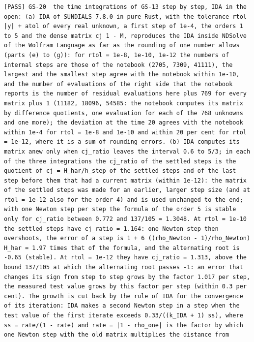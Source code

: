 \documentclass[
  10pt,
]{article}
\begin{document}
\begin{verbatim}
[PASS] GS-20  the time integrations of GS-13 step by step, IDA in the open: (a) IDA of SUNDIALS 7.8.0 in pure Rust, with the tolerance rtol |y| + atol of every real unknown, a first step of 1e-4, the orders 1 to 5 and the dense matrix cj 1 - M, reproduces the IDA inside NDSolve of the Wolfram Language as far as the rounding of one number allows (parts (e) to (g)): for rtol = 1e-8, 1e-10, 1e-12 the numbers of internal steps are those of the notebook (2705, 7309, 41111), the largest and the smallest step agree with the notebook within 1e-10, and the number of evaluations of the right side that the notebook reports is the number of residual evaluations here plus 769 for every matrix plus 1 (11182, 18096, 54585: the notebook computes its matrix by difference quotients, one evaluation for each of the 768 unknowns and one more); the deviation at the time 20 agrees with the notebook within 1e-4 for rtol = 1e-8 and 1e-10 and within 20 per cent for rtol = 1e-12, where it is a sum of rounding errors. (b) IDA computes its matrix anew only when cj_ratio leaves the interval 0.6 to 5/3; in each of the three integrations the cj_ratio of the settled steps is the quotient of cj = H_har/h_step of the settled steps and of the last step before them that had a current matrix (within 1e-12): the matrix of the settled steps was made for an earlier, larger step size (and at rtol = 1e-12 also for the order 4) and is used unchanged to the end; with one Newton step per step the formula of the order 5 is stable only for cj_ratio between 0.772 and 137/105 = 1.3048. At rtol = 1e-10 the settled steps have cj_ratio = 1.164: one Newton step then overshoots, the error of a step is 1 + 6 ((rho_Newton - 1)/rho_Newton) H_har = 1.97 times that of the formula, and the alternating root is -0.65 (stable). At rtol = 1e-12 they have cj_ratio = 1.313, above the bound 137/105 at which the alternating root passes -1: an error that changes its sign from step to step grows by the factor 1.017 per step, the measured test value grows by this factor per step (within 0.3 per cent). The growth is cut back by the rule of IDA for the convergence of its iteration: IDA makes a second Newton step in a step when the test value of the first iterate exceeds 0.33/((k_IDA + 1) ss), where ss = rate/(1 - rate) and rate = |1 - rho_one| is the factor by which one Newton step with the old matrix multiplies the distance from

\end{verbatim}
\end{document}
